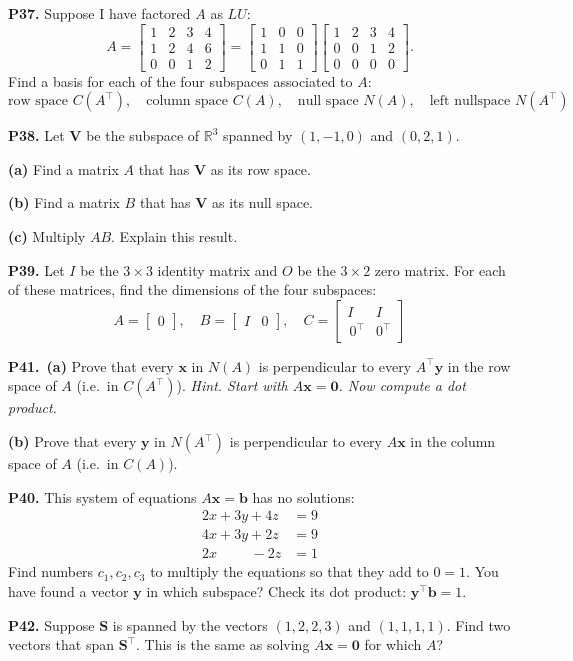 \documentclass[12pt]{amsart}
\newcommand{\bb}{\bm{b}}
\newcommand{\bx}{\bm{x}}
\newcommand{\by}{\bm{y}}
\newcommand{\bS}{\bm{S}}
\newcommand{\bV}{\bm{V}}
\newcommand{\bzero}{\bm{0}}
\newcommand{\RR}{\mathbb{R}}
\newcommand{\prob}[1]{\bigskip\noindent\textbf{#1.}\quad }
\newcommand{\epart}[1]{\medskip\noindent\textbf{(#1)}\quad }
\newcommand{\ppart}[1]{\,\textbf{(#1)}\quad }
\begin{document}
\prob{P37}  Suppose I have factored $A$ as $LU$:
    $$A = \begin{bmatrix} 1 & 2 & 3 & 4 \\
                         1 & 2 & 4 & 6 \\
                         0 & 0 & 1 & 2 \end{bmatrix}
        = \begin{bmatrix} 1 & 0 & 0 \\ 1 & 1 & 0 \\ 0 & 1 & 1 \end{bmatrix}
          \begin{bmatrix} 1 & 2 & 3 & 4 \\ 0 & 0 & 1 & 2 \\ 0 & 0 & 0 & 0 \end{bmatrix}.$$
Find a basis for each of the four subspaces associated to $A$:
    $$\text{row space } C(A^\top), \quad \text{column space } C(A), \quad \text{null space } N(A), \quad \text{left nullspace } N(A^\top)$$


\prob{P38}  Let $\bV$ be the subspace of $\RR^3$ spanned by $(1,-1,0)$ and $(0,2,1)$.

\epart{a} Find a matrix $A$ that has $\bV$ as its row space.

\epart{b} Find a matrix $B$ that has $\bV$ as its null space.

\epart{c} Multiply $AB$.  Explain this result.


\prob{P39}  Let $I$ be the $3\times 3$ identity matrix and $O$ be the $3\times 2$ zero matrix.  For each of these matrices, find the dimensions of the four subspaces:
    $$A = \begin{bmatrix} 0 \end{bmatrix}, \quad B = \begin{bmatrix} I & 0 \end{bmatrix}, \quad C = \begin{bmatrix} I & I \\ \,0^\top & 0^\top \end{bmatrix}$$


\prob{P41} \ppart{a}  Prove that every $\bx$ in $N(A)$ is perpendicular to every $A^\top \by$ in the row space of $A$ (i.e.~in $C(A^\top)$).  \emph{Hint. Start with $A \bx = \bzero$.  Now compute a dot product.}

\epart{b}  Prove that every $\by$ in $N(A^\top)$ is perpendicular to every $A \bx$ in the column space of $A$ (i.e.~in $C(A)$).


\prob{P40}  This system of equations $A\bx = \bb$ has no solutions:
\begin{align*}
2 x + 3 y + 4 z &= 9 \\
4 x + 3 y + 2 z &= 9 \\
2 x \phantom{+sxx} - 2 z &= 1
\end{align*}
Find numbers $c_1,c_2,c_3$ to multiply the equations so that they add to $0=1$.  You have found a vector $\by$ in which subspace?  Check its dot product: $\by^\top \bb = 1$.


\prob{P42}  Suppose $\bS$ is spanned by the vectors $(1,2,2,3)$ and $(1,1,1,1)$.  Find two vectors that span $\bS^\top$.  This is the same as solving $A\bx = \bzero$ for which $A$?
\end{document}
